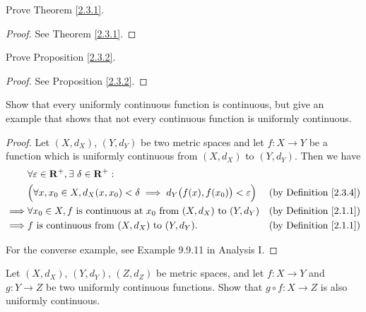 \exercisesection

\begin{exercise}\label{ex 2.3.1}
    Prove Theorem \ref{2.3.1}.
\end{exercise}

\begin{proof}
    See Theorem \ref{2.3.1}.
\end{proof}

\begin{exercise}\label{ex 2.3.2}
    Prove Proposition \ref{2.3.2}.
\end{exercise}

\begin{proof}
    See Proposition \ref{2.3.2}.
\end{proof}

\begin{exercise}\label{ex 2.3.3}
    Show that every uniformly continuous function is continuous, but give an example that shows that not every continuous function is uniformly continuous.
\end{exercise}

\begin{proof}
    Let \((X, d_X)\), \((Y, d_Y)\) be two metric spaces and let \(f : X \to Y\) be a function which is uniformly continuous from \((X, d_X)\) to \((Y, d_Y)\).
    Then we have
    \begin{align*}
                 & \forall \varepsilon \in \mathbf{R}^+, \exists\ \delta \in \mathbf{R}^+ :                                                                   \\
                 & \Big(\forall x, x_0 \in X, d_X(x, x_0) < \delta \implies d_Y\big(f(x), f(x_0)\big) < \varepsilon\Big) & \text{(by Definition \ref{2.3.4})} \\
        \implies & \forall x_0 \in X, f \text{ is continuous at } x_0 \text{ from } (X, d_X) \text{ to } (Y, d_Y)        & \text{(by Definition \ref{2.1.1})} \\
        \implies & f \text{ is continuous from } (X, d_X) \text{ to } (Y, d_Y).                                          & \text{(by Definition \ref{2.1.1})}
    \end{align*}

    For the converse example, see Example 9.9.11 in Analysis I.
\end{proof}

\begin{exercise}\label{ex 2.3.4}
    Let \((X, d_X)\), \((Y, d_Y)\), \((Z, d_Z)\) be metric spaces, and let \(f : X \to Y\) and \(g : Y \to Z\) be two uniformly continuous functions.
    Show that \(g \circ f : X \to Z\) is also uniformly continuous.
\end{exercise}


